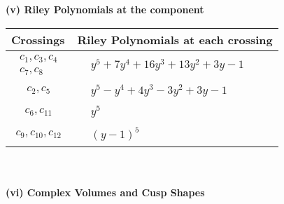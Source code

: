 \documentclass[1p]{elsarticle_modified}
\theoremstyle{definition}
\begin{document}
\newpage\renewcommand{\arraystretch}{1}
\flushleft \textbf{(v) Riley Polynomials at the component}\newline \\
\begin{tabular}{m{50pt}|m{274pt}}
Crossings & \hspace{64pt}Riley Polynomials at each crossing \\
\hline $$\begin{aligned}c_{1},c_{3},c_{4}\\c_{7},c_{8}\end{aligned}$$&$\begin{aligned}
&y^5+7 y^4+16 y^3+13 y^2+3 y-1
\end{aligned}$\\
\hline $$\begin{aligned}c_{2},c_{5}\end{aligned}$$&$\begin{aligned}
&y^5- y^4+4 y^3-3 y^2+3 y-1
\end{aligned}$\\
\hline $$\begin{aligned}c_{6},c_{11}\end{aligned}$$&$\begin{aligned}
&y^5
\end{aligned}$\\
\hline $$\begin{aligned}c_{9},c_{10},c_{12}\end{aligned}$$&$\begin{aligned}
&(y-1)^5
\end{aligned}$\\
\hline
\end{tabular}\\~\\
\newpage\flushleft \textbf{(vi) Complex Volumes and Cusp Shapes}
\end{document}
